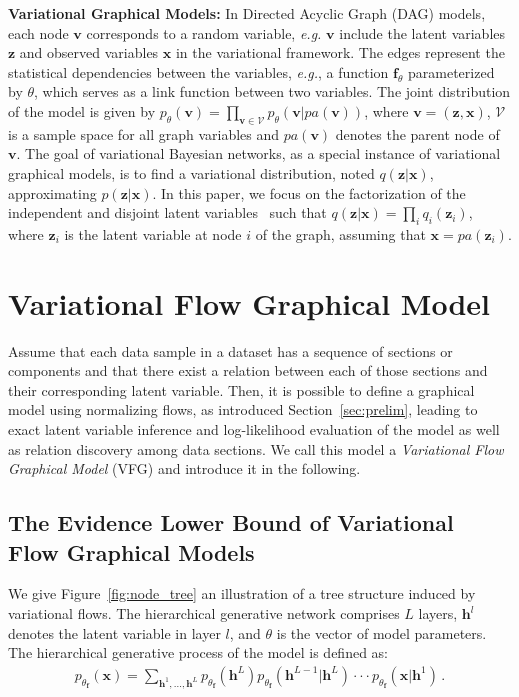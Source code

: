 \documentclass[twoside]{article}
\begin{document}
\textbf{Variational Graphical Models:}
In Directed Acyclic Graph (DAG) models, each node $\mathbf{v}$ corresponds to a random variable, \textit{e.g.} $\mathbf{v}$ include the latent variables $\mathbf{z}$ and observed variables $\mathbf{x}$ in the variational framework. 
The edges represent the statistical dependencies between the variables, \textit{e.g.}, a function $\mathbf{f}_\theta$ parameterized by $\theta$, which serves as a link function between two variables.  
The joint distribution of the model is given by $p_\theta(\mathbf{v}) = \prod_{\mathbf{v} \in \mathcal{V}} p_\theta(\mathbf{v}|pa(\mathbf{v}))$, where $\mathbf{v}=(\mathbf{z}, \mathbf{x})$, $\mathcal{V}$ is a sample space for all graph variables and $pa(\mathbf{v})$ denotes the parent node of $\mathbf{v}$. 
The goal of variational Bayesian networks, as a special instance of variational graphical models, is to find a variational distribution, noted $q(\mathbf{z}|\mathbf{x})$, approximating $p(\mathbf{z}|\mathbf{x})$. 
In this paper, we focus on the factorization of the independent and disjoint latent variables~\cite{bishop2003vibes} such that $q(\mathbf{z}|\mathbf{x}) = \prod_i q_i(\mathbf{z}_i)$, where $\mathbf{z}_i$ is the latent variable at node $i$ of the graph, assuming that $\mathbf{x}=pa(\mathbf{z}_i)$. 

\section{Variational Flow Graphical Model}\label{sec:main}

Assume that each data sample in a dataset has a sequence of sections or components and that there exist a relation between each of those sections and their corresponding latent variable.
Then, it is possible to define a graphical model using normalizing flows, as introduced Section~\ref{sec:prelim}, leading to exact latent variable inference and log-likelihood evaluation of the model as well as relation discovery among data sections. 
We call this model a \textit{Variational Flow Graphical Model} (VFG) and introduce it in the following.

\subsection{The Evidence Lower Bound of Variational Flow Graphical Models}
We give Figure~\ref{fig:node_tree} an illustration of a tree structure induced by variational flows.  
The hierarchical generative network comprises $L$ layers, $\mathbf{h}^l$ denotes the latent variable in layer $l$, and $\theta$ is the vector of model parameters. 
The hierarchical generative process of the model is defined as:
\begin{align*}
p_{\theta_{\mathbf{f}}}(\mathbf{x}) = \sum_{\mathbf{h}^1, ..., \mathbf{h}^L} p_{\theta_{\mathbf{f}}}(\mathbf{h}^L)p_{\theta_{\mathbf{f}}}(\mathbf{h}^{L-1} | \mathbf{h}^{L}) \cdot \cdot  \cdot  p_{\theta_{\mathbf{f}}}(\mathbf{x} | \mathbf{h}^{1}) \, .
\end{align*}
\end{document}
